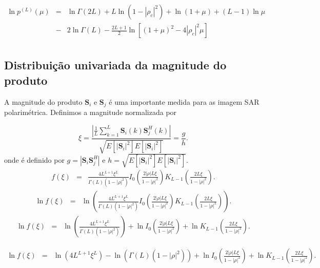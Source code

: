 \documentclass[remotesensing,article,submit,moreauthors,pdftex]{Definitions/mdpi}
\begin{document}
\begin{equation}\label{eqn64}
\begin{array}{ccl}
	\ln p^{(L)}(\mu)&=&\ln\Gamma(2L) +L\ln(1-|\rho_c|^2)+\ln(1+\mu)+(L-1)\ln\mu\\
	&-&2\ln\Gamma(L)-\frac{2L+1}{2}\ln\left[(1+\mu)^2-4|\rho_c|^2\mu \right]\\
\end{array}
\end{equation}


\subsection{Distribuição univariada da magnitude do produto}
A magnitude do produto $\mathbf{S}_i$ e $\mathbf{S}_j$ é uma importante medida para as imagem SAR polarimétrica. Definimos a magnitude normalizada por 

\begin{equation}
	\xi = \frac{\left|\frac{1}{L} \sum_{k=1}^L\mathbf{S}_i(k)\mathbf{S}_j^H(k) \right|}{\sqrt{E[|\mathbf{S}_i|^2]E[|\mathbf{S}_i|^2]}}=\frac{g}{h}.
\end{equation}
onde é definido por $g=|\mathbf{S}_i\mathbf{S}_j^H|$ e $h=\sqrt{E[|\mathbf{S}_i|^2]E[|\mathbf{S}_i|^2]}$.
\begin{equation}
\begin{array}{ccc}
	f(\xi)&=&\frac{4L^{L+1}\xi^L}{\Gamma(L)(1-|\rho|^2)}I_0\left(\frac{2|\rho|L\xi}{1-|\rho|^2}\right)K_{L-1}\left(\frac{2L\xi}{1-|\rho|^2}\right).
		\end{array}
\end{equation}
\begin{equation}
\begin{array}{ccc}
	\ln f(\xi)&=&\ln\left(\frac{4L^{L+1}\xi^L}{\Gamma(L)(1-|\rho|^2)}I_0\left(\frac{2|\rho|L\xi}{1-|\rho|^2}\right)K_{L-1}\left(\frac{2L\xi}{1-|\rho|^2}\right)\right).
		\end{array}
\end{equation}
\begin{equation}
\begin{array}{ccc}
	\ln f(\xi)&=&\ln\left(\frac{4L^{L+1}\xi^L}{\Gamma(L)(1-|\rho|^2)}\right)+\ln I_0\left(\frac{2|\rho|L\xi}{1-|\rho|^2}\right)+ \ln K_{L-1}\left(\frac{2L\xi}{1-|\rho|^2}\right).
		\end{array}
\end{equation}

\begin{equation}
\begin{array}{ccc}
	\ln f(\xi)&=&\ln (4L^{L+1}\xi^L)-\ln(\Gamma(L)(1-|\rho|^2))+\ln I_0\left(\frac{2|\rho|L\xi}{1-|\rho|^2}\right)+ \ln K_{L-1}\left(\frac{2L\xi}{1-|\rho|^2}\right).
		\end{array}
\end{equation}
\end{document}
